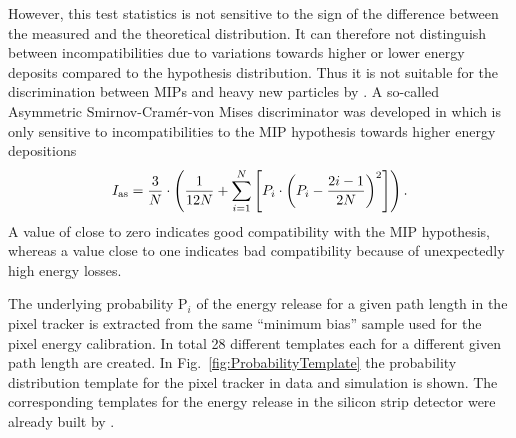 However, this test statistics is not sensitive to the sign of the difference between the measured and the theoretical distribution.
It can therefore not distinguish between incompatibilities due to variations towards higher or lower energy deposits compared to the hypothesis distribution.
Thus it is not suitable for the discrimination between MIPs and heavy new particles by \dedx.
A so-called Asymmetric Smirnov-Cram\'{e}r-von Mises discriminator was developed in \cite{bib:Quertenmont_2010} which is only sensitive to incompatibilities to the MIP hypothesis towards higher energy depositions
\begin{equation}
I_{\text{as}} = \frac{3}{N} \cdot \left( \frac{1}{12N} + \sum\limits_{i=1}^N \left[ P_i \cdot \left(P_i - \frac{2i-1}{2N} \right)^2 \right] \right).
\end{equation}
A value of \ias close to zero indicates good compatibility with the MIP hypothesis, whereas a value close to one indicates bad compatibility because of unexpectedly high energy losses.

The underlying probability P$_i$ of the energy release for a given path length in the pixel tracker is extracted from the same ``minimum bias'' sample used for the pixel energy calibration.
In total 28 different templates each for a different given path length are created.
In Fig.~\ref{fig:ProbabilityTemplate} the probability distribution template for the pixel tracker in data and simulation is shown.
The corresponding templates for the energy release in the silicon strip detector were already built by  \cite{bib:Quertenmont_2010}.


